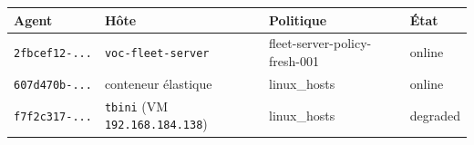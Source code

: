 \begin{center}
\small
\begin{tabularx}{\linewidth}{@{}l l l X@{}}
\toprule
\textbf{Agent} & \textbf{H\^ote} & \textbf{Politique} & \textbf{\'Etat} \\
\midrule
\texttt{2fbcef12-...} & \texttt{voc-fleet-server} & fleet-server-policy-fresh-001 & \textcolor{vocgreen}{online} \\
\texttt{607d470b-...} & conteneur \'elastique & linux\_hosts & \textcolor{vocgreen}{online} \\
\texttt{f7f2c317-...} & \texttt{tbini} (VM \texttt{192.168.184.138}) & linux\_hosts & \textcolor{vocorange}{degraded} \\
\bottomrule
\end{tabularx}
\end{center}

\clearpage
